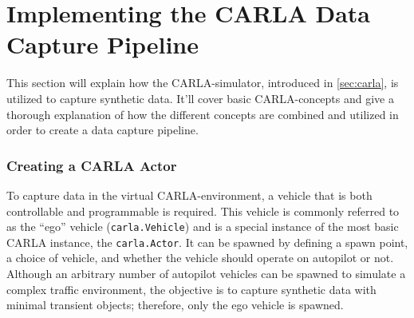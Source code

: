 \section{Implementing the CARLA Data Capture Pipeline}
This section will explain how the CARLA-simulator, introduced in \autoref{sec:carla}, is utilized to capture synthetic data. It'll cover basic CARLA-concepts and give a thorough explanation of how the different concepts are combined and utilized in order to create a data capture pipeline.

\begin{comment}

Premise: Have no data to train a NeRF on
Question: How can we collect synthetic data from CARLA?

\begin{itemize}
    \item How can you spawn an agent, etc?
    \item How does all the basic CARLA-things work? 
    \item How to mount cameras, which sensors, location and rotation (transform).
\end{itemize}
\end{comment}

\begin{comment}
    
\subsubsection{Connecting the CARLA API to a CARLA simulator}
I might add something here about how the data flows in the CARLA setup.

In order to run experiments 
\end{comment}



\subsubsection{Creating a CARLA Actor}
To capture data in the virtual CARLA-environment, a vehicle that is both controllable and programmable is required. This vehicle is commonly referred to as the “ego” vehicle (\texttt{carla.Vehicle}) and is a special instance of the most basic CARLA instance, the \texttt{carla.Actor}. It can be spawned by defining a spawn point, a choice of vehicle, and whether the vehicle should operate on autopilot or not. Although an arbitrary number of autopilot vehicles can be spawned to simulate a complex traffic environment, the objective is to capture synthetic data with minimal transient objects; therefore, only the ego vehicle is spawned.



